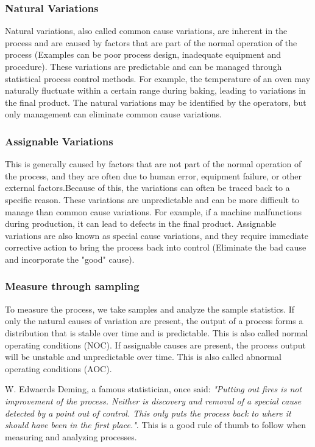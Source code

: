 \subsubsection{Natural Variations}
Natural variations, also called common cause variations, are inherent in the process and are caused by factors that are part of the normal operation of the process (Examples can be poor process design, inadequate equipment and procedure). These variations are predictable and can be managed through statistical process control methods. For example, the temperature of an oven may naturally fluctuate within a certain range during baking, leading to variations in the final product. The natural variations may be identified by the operators, but only management can eliminate common cause variations.

\subsubsection{Assignable Variations}
This is generally caused by factors that are not part of the normal operation of the process, and they are often due to human error, equipment failure, or other external factors.Because of this, the variations can often be traced back to a specific reason. These variations are unpredictable and can be more difficult to manage than common cause variations. For example, if a machine malfunctions during production, it can lead to defects in the final product. Assignable variations are also known as special cause variations, and they require immediate corrective action to bring the process back into control (Eliminate the bad cause and incorporate the "good" cause).

\subsubsection{Measure through sampling}
To measure the process, we take samples and analyze the sample statistics. If only the natural causes of variation are present, the output of a process forms a distribution that is stable over time and is predictable. This is also called normal operating conditions (NOC). If assignable causes are present, the process output will be unstable and unpredictable over time. This is also called abnormal operating conditions (AOC).

W. Edwaerds Deming, a famous statistician, once said: \textit{"Putting out fires is not improvement of the process. Neither is discovery and removal of a special cause detected by a point out of control. This only puts the process back to where it should have been in the first place."}. This is a good rule of thumb to follow when measuring and analyzing processes.

